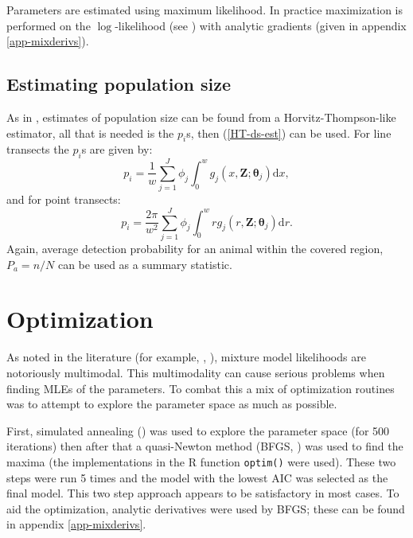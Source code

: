 Parameters are estimated using maximum likelihood. In practice maximization is performed on the $\log$-likelihood (see ) with analytic gradients (given in appendix \ref{app-mixderivs}).



\subsection{Estimating population size}

As in , estimates of population size can be found from a Horvitz-Thompson-like estimator, all that is needed is the $p_i$s, then (\ref{HT-ds-est}) can be used. For line transects the $p_i$s are given by:
\begin{equation*}
p_i = \frac{1}{w} \sum_{j=1}^J \phi_j \int_0^w  g_j(x,\mathbf{Z}; \bm{\theta}_j) \text{d}x,
\end{equation*}
and for point transects:
\begin{equation*}
p_i = \frac{2\pi}{w^2} \sum_{j=1}^J \phi_j \int_0^w  r g_j(r,\mathbf{Z}; \bm{\theta}_j) \text{d}r.
\end{equation*}
Again, average detection probability for an animal within the covered region, $P_a=n/N$ can be used as a summary statistic.


\section{Optimization}
\label{s:optimization}

As noted in the literature (for example, \cite[463-480]{BDA}, \cite{robert}), mixture model likelihoods are notoriously multimodal. This multimodality can cause serious problems when finding MLEs of the parameters. To combat this a mix of optimization routines was to attempt to explore the parameter space as  much as possible.

First, simulated annealing (\cite[pp. 549-554]{numrec}) was used to explore the parameter space (for 500 iterations) then after that a quasi-Newton method (BFGS, \cite{bfgs}) was used to find the maxima (the implementations in the \textsf{R} function \texttt{optim()} were used). These two steps were run 5 times and the model with the lowest AIC was selected as the final model. This two step approach appears to be satisfactory in most cases. To aid the optimization, analytic derivatives were used by BFGS; these can be found in appendix \ref{app-mixderivs}.

